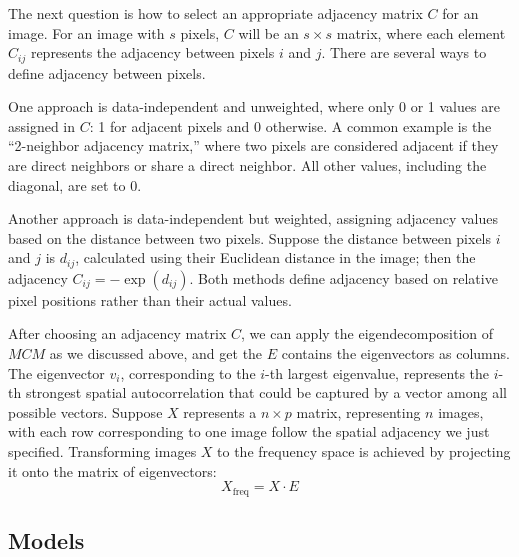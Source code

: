 \documentclass[12pt]{article}
\begin{document}
The next question is how to select an appropriate adjacency matrix \( C \) for an image. For an image with \( s \) pixels, \( C \) will be an \( s \times s \) matrix, where each element \( C_{ij} \) represents the adjacency between pixels \( i \) and \( j \). There are several ways to define adjacency between pixels. 

One approach is data-independent and unweighted, where only 0 or 1 values are assigned in \( C \): 1 for adjacent pixels and 0 otherwise. A common example is the “2-neighbor adjacency matrix,” where two pixels are considered adjacent if they are direct neighbors or share a direct neighbor. All other values, including the diagonal, are set to 0.

Another approach is data-independent but weighted, assigning adjacency values based on the distance between two pixels. Suppose the distance between pixels \( i \) and \( j \) is \( d_{ij} \), calculated using their Euclidean distance in the image; then the adjacency \( C_{ij} = - \exp(d_{ij}) \). Both methods define adjacency based on relative pixel positions rather than their actual values.

After choosing an adjacency matrix \( C \), we can apply the eigendecomposition of \( M C M \) as we discussed above, and get the \( E \) contains the eigenvectors as columns. The eigenvector \( v_i \), corresponding to the \( i \)-th largest eigenvalue, represents the \( i \)-th strongest spatial autocorrelation that could be captured by a vector among all possible vectors. Suppose \( X \) represents a \( n \times p \) matrix, representing \( n \) images, with each row corresponding to one image follow the spatial adjacency we just specified. Transforming images \( X \) to the frequency space is achieved by projecting it onto the matrix of eigenvectors:
\[
  X_{\text{freq}} = X \cdot E
\]

\subsection{Models}
\end{document}
